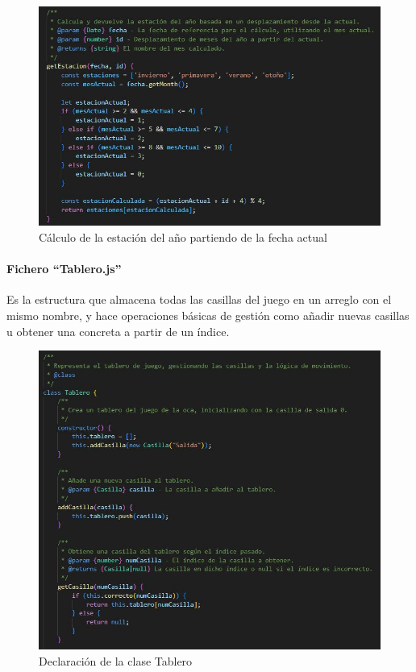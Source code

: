 \begin{figure}[H]
	\centering
	\includegraphics{imgs/codigo-casillas-8.jpg}
	\caption{Cálculo de la estación del año partiendo de la fecha actual}
	\label{fig:codigo-casillas-8}
\end{figure}

\paragraph{Fichero \enquote{Tablero.js}}

Es la estructura que almacena todas las casillas del juego en un arreglo con el mismo nombre, y hace operaciones básicas de gestión como añadir nuevas casillas u obtener una concreta a partir de un índice.

\begin{figure}[H]
	\centering
	\includegraphics{imgs/codigo-tablero-1.jpg}
	\caption{Declaración de la clase Tablero}
	\label{fig:codigo-tablero-1}
\end{figure}

